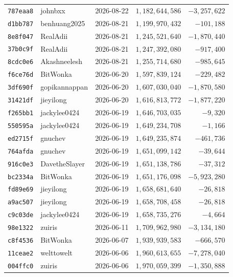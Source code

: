 {\begin{longtable}{@{}lllrr@{}}
\texttt{787eaa8} & johnbxx & 2026-08-22 & $1{,}182{,}644{,}586$ & $-3{,}257{,}622$\\
\texttt{d1bb787} & benhuang2025 & 2026-08-21 & $1{,}199{,}970{,}432$ & $-101{,}188$\\
\texttt{8e8f047} & RealAdii & 2026-08-21 & $1{,}245{,}521{,}640$ & $-1{,}870{,}440$\\
\texttt{37b0c9f} & RealAdii & 2026-08-21 & $1{,}247{,}392{,}080$ & $-917{,}400$\\
\texttt{8cdc0e6} & Akashneelesh & 2026-08-21 & $1{,}255{,}714{,}680$ & $-985{,}645$\\
\texttt{f6ce76d} & BitWonka & 2026-06-20 & $1{,}597{,}839{,}124$ & $-229{,}482$\\
\texttt{3df690f} & gopikannappan & 2026-06-20 & $1{,}607{,}030{,}040$ & $-1{,}870{,}580$\\
\texttt{31421df} & jieyilong & 2026-06-20 & $1{,}616{,}813{,}772$ & $-1{,}877{,}220$\\
\texttt{f265bb1} & jackylee0424 & 2026-06-19 & $1{,}646{,}703{,}035$ & $-9{,}320$\\
\texttt{550595a} & jackylee0424 & 2026-06-19 & $1{,}649{,}234{,}708$ & $-1{,}166$\\
\texttt{ed2715f} & gnuchev & 2026-06-19 & $1{,}649{,}235{,}874$ & $-461{,}736$\\
\texttt{764afda} & gnuchev & 2026-06-19 & $1{,}651{,}099{,}142$ & $-39{,}644$\\
\texttt{916c0e3} & DavetheSlayer & 2026-06-19 & $1{,}651{,}138{,}786$ & $-37{,}312$\\
\texttt{bc2334a} & BitWonka & 2026-06-19 & $1{,}651{,}176{,}098$ & $-5{,}923{,}280$\\
\texttt{fd89e69} & jieyilong & 2026-06-19 & $1{,}658{,}681{,}640$ & $-26{,}818$\\
\texttt{a9ac507} & jieyilong & 2026-06-19 & $1{,}658{,}708{,}458$ & $-26{,}818$\\
\texttt{c9c03de} & jackylee0424 & 2026-06-19 & $1{,}658{,}735{,}276$ & $-4{,}664$\\
\texttt{98e1322} & zuiris & 2026-06-11 & $1{,}709{,}962{,}980$ & $-3{,}134{,}180$\\
\texttt{c8f4536} & BitWonka & 2026-06-07 & $1{,}939{,}939{,}583$ & $-666{,}570$\\
\texttt{11ceae2} & welttowelt & 2026-06-06 & $1{,}960{,}613{,}655$ & $-7{,}278{,}040$\\
\texttt{004ffc0} & zuiris & 2026-06-06 & $1{,}970{,}059{,}399$ & $-1{,}350{,}888$\\

\end{longtable}}
